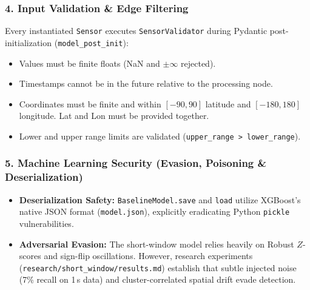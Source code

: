 \documentclass[10pt,a4paper]{report}
\begin{document}
\subsubsection{4. Input Validation \& Edge Filtering}
Every instantiated \texttt{Sensor} executes \texttt{SensorValidator} during Pydantic post-initialization (\texttt{model\_post\_init}):
\begin{itemize}[leftmargin=*]
  \item Values must be finite floats (NaN and $\pm\infty$ rejected).
  \item Timestamps cannot be in the future relative to the processing node.
  \item Coordinates must be finite and within $[-90, 90]$ latitude and $[-180, 180]$ longitude. Lat and Lon must be provided together.
  \item Lower and upper range limits are validated (\texttt{upper\_range > lower\_range}).
\end{itemize}

\subsubsection{5. Machine Learning Security (Evasion, Poisoning \& Deserialization)}
\begin{itemize}[leftmargin=*]
  \item \textbf{Deserialization Safety:} \texttt{BaselineModel.save} and \texttt{load} utilize XGBoost's native JSON format (\texttt{model.json}), explicitly eradicating Python \texttt{pickle} vulnerabilities.
  \item \textbf{Adversarial Evasion:} The short-window model relies heavily on Robust $Z$-scores and sign-flip oscillations. However, research experiments (\texttt{research/short\_window/results.md}) establish that subtle injected noise (7\% recall on 1\,s data) and cluster-correlated spatial drift evade detection.
\end{itemize}
\end{document}
